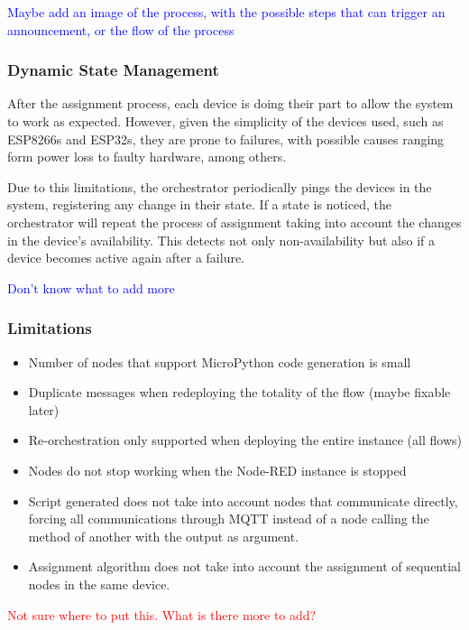 \textcolor{blue}{Maybe add an image of the process, with the possible steps that can trigger an announcement, or the flow of the process}

\subsubsection{Dynamic State Management}\label{sec:dynamic_state_management}


After the assignment process, each device is doing their part to allow the system to work as expected. However, given the simplicity of the devices used, such as ESP8266s and ESP32s, they are prone to failures, with possible causes ranging form power loss to faulty hardware, among others.

Due to this limitations, the orchestrator periodically pings the devices in the system, registering any change in their state. If a state is noticed, the orchestrator will repeat the process of assignment taking into account the changes in the device's availability. This detects not only non-availability but also if a device becomes active again after a failure.

\textcolor{blue}{Don't know what to add more}

\subsubsection{Limitations}\label{sec:limitations}

\begin{itemize}
    \item Number of nodes that support MicroPython code generation is small
    \item Duplicate messages when redeploying the totality of the flow (maybe fixable later)
    \item Re-orchestration only supported when deploying the entire instance (all flows)
    \item Nodes do not stop working when the Node-RED instance is stopped
    \item Script generated does not take into account nodes that communicate directly, forcing all communications through MQTT instead of a node calling the method of another with the output as argument.
    \item Assignment algorithm does not take into account the assignment of sequential nodes in the same device.
\end{itemize}

\textcolor{red}{Not sure where to put this. What is there more to add?}